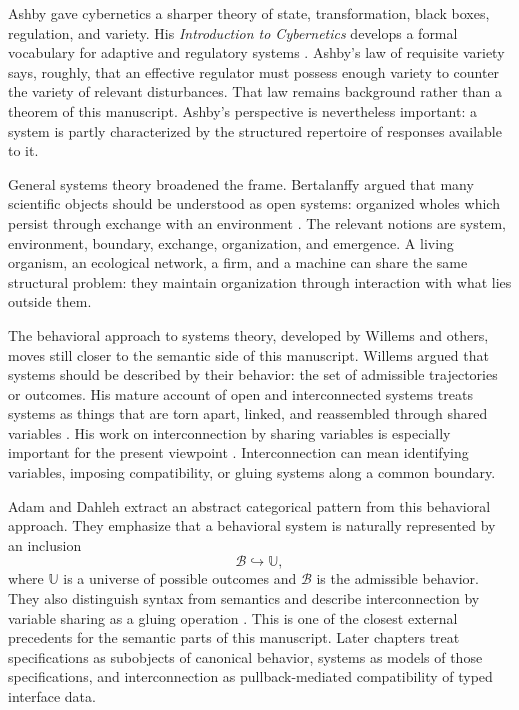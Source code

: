 Ashby gave cybernetics a sharper theory of state, transformation, black boxes,
regulation, and variety.  His \emph{Introduction to Cybernetics} develops a
formal vocabulary for adaptive and regulatory systems
\cite{Ashby1956IntroductionCybernetics}.  Ashby's law of requisite variety
says, roughly, that an effective regulator must possess enough variety to
counter the variety of relevant disturbances.  That law remains background
rather than a theorem of this manuscript.  Ashby's perspective is nevertheless
important: a system is partly characterized by the structured repertoire of
responses available to it.

General systems theory broadened the frame.  Bertalanffy argued that many
scientific objects should be understood as open systems: organized wholes
which persist through exchange with an environment
\cite{Bertalanffy1968GeneralSystemTheory}.  The relevant notions are system,
environment, boundary, exchange, organization, and emergence.  A living
organism, an ecological network, a firm, and a machine can share the same
structural problem: they maintain organization through interaction with what
lies outside them.

The behavioral approach to systems theory, developed by Willems and others,
moves still closer to the semantic side of this manuscript.  Willems argued
that systems should be described by their behavior: the set of admissible
trajectories or outcomes.  His mature account of open and interconnected
systems treats systems as things that are torn apart, linked, and reassembled
through shared variables \cite{Willems2007BehavioralApproach}.  His work on
interconnection by sharing variables is especially important for the present
viewpoint \cite{Willems2007InterconnectionSharingVariables}.  Interconnection
can mean identifying variables, imposing compatibility, or gluing systems
along a common boundary.

Adam and Dahleh extract an abstract categorical pattern from this behavioral
approach.  They emphasize that a behavioral system is naturally represented by
an inclusion
\[
  \mathcal B\hookrightarrow \mathbb U,
\]
where \(\mathbb U\) is a universe of possible outcomes and \(\mathcal B\) is
the admissible behavior.  They also distinguish syntax from semantics and
describe interconnection by variable sharing as a gluing operation
\cite{AdamDahleh2019AbstractBehavioralApproach}.  This is one of the closest
external precedents for the semantic parts of this manuscript.  Later chapters
treat specifications as subobjects of canonical behavior, systems as models
of those specifications, and interconnection as pullback-mediated
compatibility of typed interface data.

